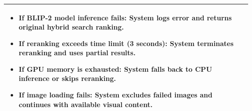 \begin{minipage}{\textwidth}
\begin{tabularx}{\textwidth}{|p{}|X|}
{        \begin{itemize}
            \item If BLIP-2 model inference fails: System logs error and returns original hybrid search ranking.
            \item If reranking exceeds time limit (3 seconds): System terminates reranking and uses partial results.
            \item If GPU memory is exhausted: System falls back to CPU inference or skips reranking.
            \item If image loading fails: System excludes failed images and continues with available visual content.
        \end{itemize}%
        } \\
    \hline
\end{tabularx}
\end{minipage}
\bigskip

